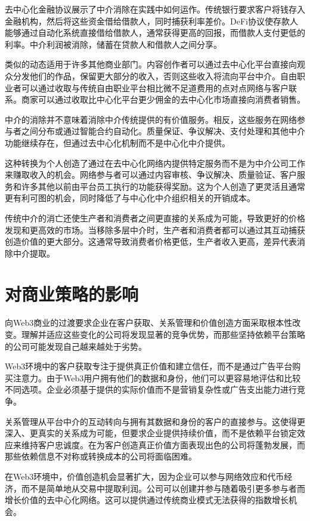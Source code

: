 \documentclass[
  Letterpaper,
]{scrbook}
\begin{document}
去中心化金融协议展示了中介消除在实践中如何运作。传统银行要求客户将钱存入金融机构，然后将这些资金借给借款人，同时捕获利率差价。DeFi协议使存款人能够通过自动化系统直接借给借款人，通常获得更高的回报，而借款人支付更低的利率。中介利润被消除，储蓄在贷款人和借款人之间分享。

类似的动态适用于许多其他商业部门。内容创作者可以通过去中心化平台直接向观众分发他们的作品，保留更大部分的收入，否则这些收入将流向平台中介。自由职业者可以通过收取与传统自由职业平台相比微不足道费用的点对点网络与客户联系。商家可以通过收取比中心化平台更少佣金的去中心化市场直接向消费者销售。

中介的消除并不意味着消除中介传统提供的有价值服务。相反，这些服务在网络参与者之间分布或通过智能合约自动化。质量保证、争议解决、支付处理和其他中介功能继续存在，但通过去中心化机制而不是中心化中介提供。

这种转换为个人创造了通过在去中心化网络内提供特定服务而不是为中介公司工作来赚取收入的机会。网络参与者可以通过内容审核、争议解决、质量验证、客户服务和许多其他以前由平台员工执行的功能获得奖励。这为个人创造了更灵活且通常更有利可图的机会，同时降低了与中心化中介组织相关的开销成本。

传统中介的消亡还使生产者和消费者之间更直接的关系成为可能，导致更好的价格发现和更高效的市场。当移除多层中介时，生产者和消费者都可以通过其互动捕获创造价值的更大部分。这通常导致消费者价格更低，生产者收入更高，差异代表消除中介提取。

\section{对商业策略的影响}\label{ux5bf9ux5546ux4e1aux7b56ux7565ux7684ux5f71ux54cd}

向Web3商业的过渡要求企业在客户获取、关系管理和价值创造方面采取根本性改变。理解并适应这些变化的公司将发现显著的竞争优势，而那些坚持依赖平台策略的公司可能发现自己越来越处于劣势。

Web3环境中的客户获取专注于提供真正价值和建立信任，而不是通过广告平台购买注意力。由于Web3用户拥有他们的数据和身份，他们可以更容易地评估和比较不同选项。企业必须基于提供的实际价值而不是营销复杂性或广告支出能力进行竞争。

关系管理从平台中介的互动转向与拥有其数据和身份的客户的直接参与。这使得更深入、更真实的关系成为可能，但要求企业提供持续价值，而不是依赖平台锁定效应来维持客户忠诚度。在为客户创造真正价值方面表现出色的公司将蓬勃发展，而那些依赖信息不对称或转换成本的公司将面临困难。

在Web3环境中，价值创造机会显著扩大，因为企业可以参与网络效应和代币经济，而不是简单地从交易中提取利润。公司可以创建并参与随着吸引更多参与者而增长价值的去中心化网络。这可以提供通过传统商业模式无法获得的指数增长机会。
\end{document}
